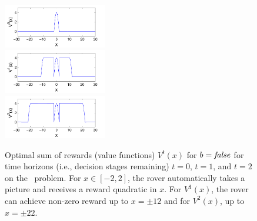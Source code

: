 \begin{figure}[t!]
\centering
\includegraphics[width=0.4\textwidth]{Figures1/v1_mr.pdf}\\
\includegraphics[width=0.4\textwidth]{Figures1/v2_mr.pdf}\\
\includegraphics[width=0.4\textwidth]{Figures1/v3_mr.pdf}
\vspace{-2mm}
\caption{\footnotesize Optimal sum of rewards 
(value functions) $V^t(x)$ for $b =
\mathit{false}$ for time horizons (i.e., decision stages remaining) $t=0$,
$t=1$, and $t=2$ on the \MarsRover\ problem.  For $x \in [-2,2]$, the
rover automatically takes a picture and receives a reward quadratic in
$x$.  For $V^1(x)$, the rover can achieve
non-zero reward up to $x = \pm 12$ and for 
$V^2(x)$, up to $x = \pm 22$.}
\label{fig:opt_graph}
\end{figure}

